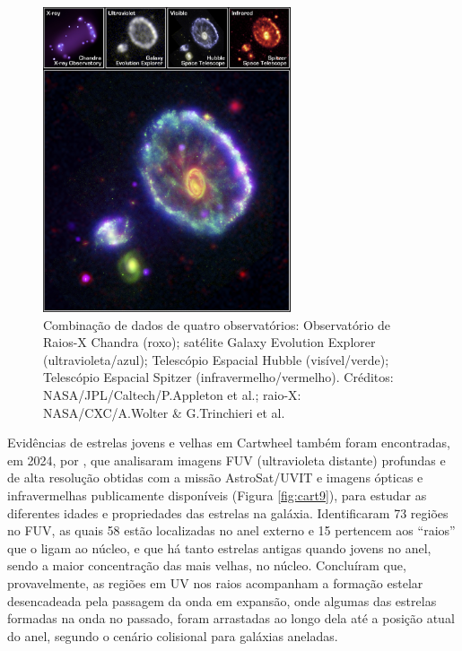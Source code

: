 \begin{figure}[h]
  \centering 
  \includegraphics[width=0.65\textwidth]{Imagens/Cartwheel04.jpg} 
  \caption[Composição de imagens de Cartwheel.]{Combinação de dados de quatro observatórios: Observatório de Raios-X Chandra (roxo); satélite Galaxy Evolution Explorer (ultravioleta/azul); Telescópio Espacial Hubble (visível/verde); Telescópio Espacial Spitzer (infravermelho/vermelho). Créditos: NASA/JPL/Caltech/P.Appleton et al.; raio-X: NASA/CXC/A.Wolter \& G.Trinchieri et al.}
  \label{fig:cart4} 
\end{figure}

Evidências de estrelas jovens e velhas em Cartwheel também foram encontradas, em 2024, por , que analisaram imagens FUV (ultravioleta distante) profundas e de alta resolução obtidas com a missão AstroSat/UVIT e imagens ópticas e infravermelhas publicamente disponíveis (Figura \ref{fig:cart9}), para estudar as diferentes idades e propriedades das estrelas na galáxia. Identificaram 73 regiões no FUV, as quais 58 estão localizadas no anel externo e 15 pertencem aos ``raios'' que o ligam ao núcleo, e que há tanto estrelas antigas quando jovens no anel, sendo a maior concentração das mais velhas, no núcleo. Concluíram que, provavelmente, as regiões em UV nos raios acompanham a formação estelar desencadeada pela passagem da onda em expansão, onde algumas das estrelas formadas na onda no passado, foram arrastadas ao longo dela até a posição atual do anel, segundo o cenário colisional para galáxias aneladas.


